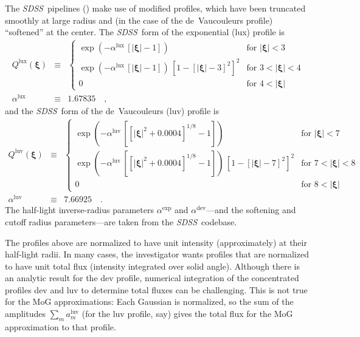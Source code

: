 \documentclass[12pt,pdftex,preprint]{aastex}
\newcommand{\project}[1]{\textsl{#1}}
\newcommand{\sdss}{\project{SDSS}}
\newcommand{\tvector}[1]{\boldsymbol{#1}}
\newcommand{\spos}{\tvector{\xi}}
\newcommand{\dev}{\mathrm{dev}}
\newcommand{\lux}{\mathrm{lux}}
\newcommand{\luv}{\mathrm{luv}}
\begin{document}
The \sdss\ pipelines (\citealt{lupton}) make use of modified profiles,
which have been truncated smoothly at large radius and (in the case of
the de~Vaucouleurs profile) ``softened'' at the center.  The
\sdss\ form of the exponential (lux) profile is
\begin{eqnarray}\displaystyle
Q^{\lux}(\spos) &\equiv& \left\{\begin{array}{ll}
  \exp(-\alpha^{\lux}\,[|\spos| - 1]) & \mbox{for~}|\spos| < 3 \\
  \exp(-\alpha^{\lux}\,[|\spos| - 1])
  \,\left[1 - [|\spos| - 3]^2\right]^2 & \mbox{for~}3 < |\spos| < 4 \\
  0                                   & \mbox{for~}4 < |\spos|
\end{array}\right.
\\
\alpha^{\lux} &\equiv& 1.67835
\quad ,
\end{eqnarray}
and the \sdss\ form of the de~Vaucouleurs (luv) profile is
\begin{eqnarray}\displaystyle
Q^{\luv}(\spos) &\equiv& \left\{\begin{array}{ll}
  \exp(-\alpha^{\luv}\,\left[[|\spos|^2 + 0.0004]^{1/8} - 1\right]) & \mbox{for~}|\spos| < 7 \\
  \exp(-\alpha^{\luv}\,\left[[|\spos|^2 + 0.0004]^{1/8} - 1\right])
  \,\left[1 - [|\spos| - 7]^2\right]^2 & \mbox{for~}7 < |\spos| < 8 \\
  0                                   & \mbox{for~}8 < |\spos|
\end{array}\right.
\\
\alpha^{\luv} &\equiv& 7.66925
\quad .
\end{eqnarray}
The half-light inverse-radius parameters $\alpha^{\exp}$ and
$\alpha^{\dev}$---and the softening and cutoff radius parameters---are
taken from the \sdss\ codebase.

The profiles above are normalized to have unit intensity
(approximately) at their half-light radii.  In many cases, the
investigator wants profiles that are normalized to have unit total
flux (intensity integrated over solid angle).  Although there is an
analytic result for the dev profile, numerical integration of the
concentrated profiles dev and luv to determine total fluxes can be
challenging.  This is not true for the MoG approximations: Each
Gaussian is normalized, so the sum of the amplitudes $\sum_m
a^{\luv}_m$ (for the luv profile, say) gives the total flux for the
MoG approximation to that profile.
\end{document}
